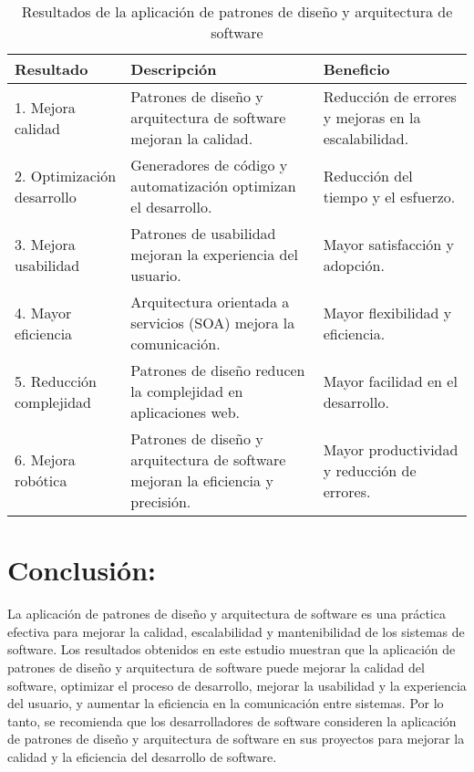 \documentclass[twocolumn]{article}
\begin{document}
\begin{table}[h!]
\centering
\begin{tabular}{|p{1.2cm}|p{2.5cm}|p{2.5cm}|}
\hline
\textbf{Resultado} & \textbf{Descripción} & \textbf{Beneficio} \\ \hline
1. Mejora calidad & Patrones de diseño y arquitectura de software mejoran la calidad. & Reducción de errores y mejoras en la escalabilidad. \\ \hline
2. Optimización desarrollo & Generadores de código y automatización optimizan el desarrollo. & Reducción del tiempo y el esfuerzo. \\ \hline
3. Mejora usabilidad & Patrones de usabilidad mejoran la experiencia del usuario. & Mayor satisfacción y adopción. \\ \hline
4. Mayor eficiencia & Arquitectura orientada a servicios (SOA) mejora la comunicación. & Mayor flexibilidad y eficiencia. \\ \hline
5. Reducción complejidad & Patrones de diseño reducen la complejidad en aplicaciones web. & Mayor facilidad en el desarrollo. \\ \hline
6. Mejora robótica & Patrones de diseño y arquitectura de software mejoran la eficiencia y precisión. & Mayor productividad y reducción de errores. \\ \hline
\end{tabular}
\caption{Resultados de la aplicación de patrones de diseño y arquitectura de software}
\label{tabla:resultados}
\end{table}

\vspace{0.5cm}

\section{Conclusión:}
La aplicación de patrones de diseño y arquitectura de software es una práctica efectiva para mejorar la calidad, escalabilidad y mantenibilidad de los sistemas de software. Los resultados obtenidos en este estudio muestran que la aplicación de patrones de diseño y arquitectura de software puede mejorar la calidad del software, optimizar el proceso de desarrollo, mejorar la usabilidad y la experiencia del usuario, y aumentar la eficiencia en la comunicación entre sistemas. Por lo tanto, se recomienda que los desarrolladores de software consideren la aplicación de patrones de diseño y arquitectura de software en sus proyectos para mejorar la calidad y la eficiencia del desarrollo de software.
\end{document}
